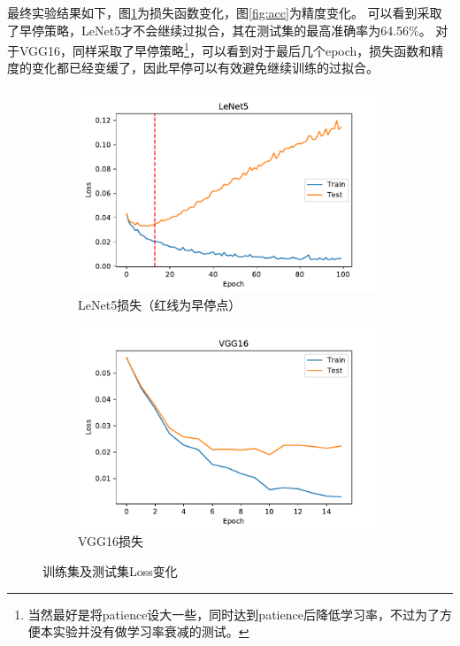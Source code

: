 \documentclass[logo,reportComp]{thesis}
\begin{document}
最终实验结果如下，图\ref{fig:loss}为损失函数变化，图\ref{fig:acc}为精度变化。
可以看到采取了早停策略，LeNet5才不会继续过拟合，其在测试集的最高准确率为64.56\%。
对于VGG16，同样采取了早停策略\footnote{当然最好是将patience设大一些，同时达到patience后降低学习率，不过为了方便本实验并没有做学习率衰减的测试。}，可以看到对于最后几个epoch，损失函数和精度的变化都已经变缓了，因此早停可以有效避免继续训练的过拟合。
\begin{figure}[H]
\begin{subfigure}{0.5\textwidth}
\centering
\includegraphics[width=\linewidth]{fig/LeNet5_loss.pdf}
\caption{LeNet5损失（红线为早停点）}
\end{subfigure}
\begin{subfigure}{0.5\textwidth}
\centering
\includegraphics[width=\linewidth]{fig/VGG16_loss.pdf}
\caption{VGG16损失}
\end{subfigure}
\caption{训练集及测试集Loss变化}
\label{fig:loss}
\end{figure}
\end{document}

